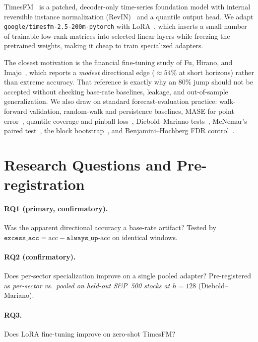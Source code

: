 \documentclass[11pt]{article}
\newcommand{\excess}{\texttt{excess\_acc}}
\newcommand{\alwaysup}{\texttt{always\_up}}
\begin{document}
TimesFM~\cite{das2024timesfm} is a patched, decoder-only time-series foundation model
with internal reversible instance normalization (RevIN)~\cite{kim2021revin} and a
quantile output head. We adapt \texttt{google/timesfm-2.5-200m-pytorch} with
LoRA~\cite{hu2021lora}, which inserts a small number of trainable low-rank matrices
into selected linear layers while freezing the pretrained weights, making it cheap to
train specialized adapters.

The closest motivation is the financial fine-tuning study of Fu, Hirano, and
Imajo~\cite{fu2024financial}, which reports a \emph{modest} directional edge
($\approx 54\%$ at short horizons) rather than extreme accuracy. That reference is
exactly why an $80\%$ jump should not be accepted without checking base-rate
baselines, leakage, and out-of-sample generalization. We also draw on standard
forecast-evaluation practice: walk-forward validation, random-walk and persistence
baselines, MASE for point error~\cite{hyndman2006another}, quantile coverage and
pinball loss~\cite{gneiting2007strictly}, Diebold--Mariano tests~\cite{diebold1995comparing,harvey1997testing},
McNemar's paired test~\cite{mcnemar1947note}, the block bootstrap~\cite{kunsch1989jackknife},
and Benjamini--Hochberg FDR control~\cite{benjamini1995controlling}.

\section{Research Questions and Pre-registration}

\paragraph{RQ1 (primary, confirmatory).} Was the apparent directional accuracy a
base-rate artifact? Tested by $\excess = \text{acc} - \alwaysup\text{-acc}$ on
identical windows.

\paragraph{RQ2 (confirmatory).} Does per-sector specialization improve on a single
pooled adapter? Pre-registered as \emph{per-sector vs.\ pooled on held-out S\&P~500
stocks at $h=128$} (Diebold--Mariano).

\paragraph{RQ3.} Does LoRA fine-tuning improve on zero-shot TimesFM?
\end{document}
